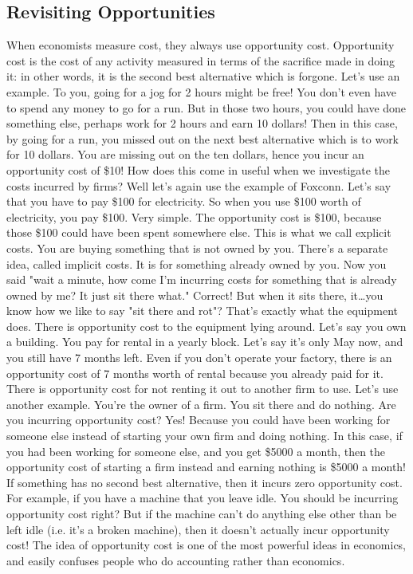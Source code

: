 \subsection{Revisiting Opportunities}
When economists measure cost, they always use opportunity cost. Opportunity cost is the cost of any activity measured in terms of the sacrifice made in doing it: in other words, it is the second best alternative which is forgone. Let's use an example. To you, going for a jog for 2 hours might be free! You don't even have to spend any money to go for a run. But in those two hours, you could have done something else, perhaps work for 2 hours and earn 10 dollars! Then in this case, by going for a run, you missed out on the next best alternative which is to work for 10 dollars. You are missing out on the ten dollars, hence you incur an opportunity cost of \$10! How does this come in useful when we investigate the costs incurred by firms? Well let's again use the example of Foxconn. Let's say that you have to pay \$100 for electricity. So when you use \$100 worth of electricity, you pay \$100. Very simple. The opportunity cost is \$100, because those \$100 could have been spent somewhere else. This is what we call explicit costs. You are buying something that is not owned by you. There's a separate idea, called implicit costs. It is for something already owned by you. Now you said "wait a minute, how come I'm incurring costs for something that is already owned by me? It just sit there what." Correct! But when it sits there, it\ldots you know how we like to say "sit there and rot"? That's exactly what the equipment does. There is opportunity cost to the equipment lying around. Let's say you own a building. You pay for rental in a yearly block. Let's say it's only May now, and you still have 7 months left. Even if you don't operate your factory, there is an opportunity cost of 7 months worth of rental because you already paid for it. There is opportunity cost for not renting it out to another firm to use. Let's use another example. You're the owner of a firm. You sit there and do nothing. Are you incurring opportunity cost? Yes! Because you could have been working for someone else instead of starting your own firm and doing nothing. In this case, if you had been working for someone else, and you get \$5000 a month, then the opportunity cost of starting a firm instead and earning nothing is \$5000 a month! If something has no second best alternative, then it incurs zero opportunity cost. For example, if you have a machine that you leave idle. You should be incurring opportunity cost right? But if the machine can't do anything else other than be left idle (i.e. it's a broken machine), then it doesn't actually incur opportunity cost! The idea of opportunity cost is one of the most powerful ideas in economics, and easily confuses people who do accounting rather than economics. 
